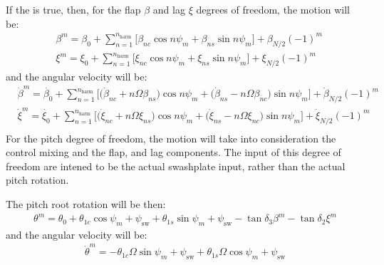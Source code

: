 If the  is true, then, for the flap $\beta$ and lag $\xi$ degrees of freedom, the motion will be:
\begin{align}
    &\beta^{m} = \beta_0 + \sum_{n = 1}^{n_\mathrm{harm}} \Big[\beta_{nc}\cos{n\psi_m} + \beta_{ns}\sin{n\psi_m}\Big] + \beta_{N/2}(-1)^{m} \\  
    &\xi^{m} = \xi_0 + \sum_{n = 1}^{n_\mathrm{harm}} \Big[\xi_{nc}\cos{n\psi_m} + \xi_{ns}\sin{n\psi_m}\Big] + \xi_{N/2}(-1)^{m}   
\end{align}
and the angular velocity will be: 
\begin{align} 
    &\dot{\beta}^{m} = \dot{\beta_0} + \sum_{n = 1}^{n_\mathrm{harm}} \Big[\big(\dot{\beta}_{nc} + n\Omega\beta_{ns}\big) \cos{n\psi_m} + 
                                    \big(\dot{\beta}_{ns} - n\Omega\beta_{nc}\big) \sin{n\psi_m}\Big]  +  \dot{\beta}_{N/2}(-1)^{m} \\
    &\dot{\xi}^{m} = \dot{\xi_0} + \sum_{n = 1}^{n_\mathrm{harm}} \Big[\big(\dot{\xi}_{nc} + n\Omega\xi_{ns}\big) \cos{n\psi_m} + 
                                    \big(\dot{\xi}_{ns} - n\Omega\xi_{nc}\big) \sin{n\psi_m}\Big]  +  \dot{\xi}_{N/2}(-1)^{m} \\
\end{align}
For the pitch degree of freedom, the motion will take into consideration the control mixing and the flap, and lag components. The input of this degree of freedom 
are intened to be the actual swashplate input, rather than the actual pitch rotation. 

The pitch root rotation will be then:
\begin{align}
    \theta^{m} = \theta_0 + \theta_{1c}\cos{\psi_m + \psi_\mathrm{sw}} + \theta_{1s}\sin{\psi_m + \psi_\mathrm{sw}} -\tan{\delta_3}\beta^{m} - \tan{\delta_2}\xi^{m}   
\end{align}
and the angular velocity will be: 
\begin{align} 
    \dot{\theta}^{m} = -\theta_{1c}\Omega\sin{\psi_m + \psi_\mathrm{sw}} + \theta_{1s}\Omega\cos{\psi_m + \psi_\mathrm{sw}}                                     
\end{align}


